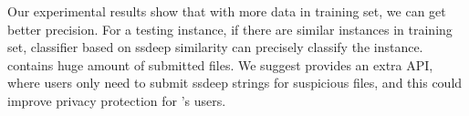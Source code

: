 Our experimental results show that with more data in training set, 
we can get better precision. 
For a testing instance, if there are similar instances in training set, 
classifier based on ssdeep similarity can precisely classify the instance. 
\vt{} contains huge amount of submitted files. We suggest \vt{} provides an extra API, 
where users only need to submit ssdeep strings for suspicious files, 
and this could improve privacy protection for \vt{}’s users.  



